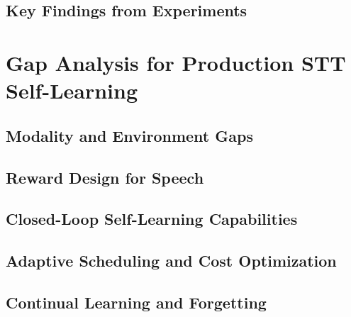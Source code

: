 \documentclass[conference]{IEEEtran}
\begin{document}
\subsection{Key Findings from Experiments}

\section{Gap Analysis for Production STT Self-Learning}

\subsection{Modality and Environment Gaps}

\subsection{Reward Design for Speech}

\subsection{Closed-Loop Self-Learning Capabilities}

\subsection{Adaptive Scheduling and Cost Optimization}

\subsection{Continual Learning and Forgetting}
\end{document}
